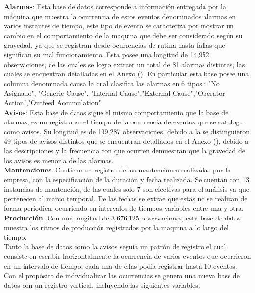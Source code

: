 \documentclass[10pt]{article}
\begin{document}
\textbf{Alarmas}: Esta base de datos corresponde a información entregada por la máquina que muestra la ocurrencia de estos eventos denominados alarmas en varios instantes de tiempo, este tipo de evento se caracteriza por mostrar un cambio en el comportamiento de la maquina que debe ser considerado según su gravedad, ya que se registran desde ocurrencias de rutina hasta  fallas que significan su mal funcionamiento. Esta posee una longitud de 14,952 observaciones, de las cuales se logro extraer un total de 81 alarmas distintas, las cuales se encuentran detalladas en el Anexo (). En particular esta base posee una columna denominada causa la cual clasifica las alarmas en 6 tipos : "No Asignado", "Generic Cause", "Internal Cause","External Cause","Operator Action","Outfeed Accumulation"\\

\textbf{Avisos}: Esta base de datos sigue el mismo comportamiento que la base de alarmas, es un registro en el tiempo de la ocurrencia de eventos que se catalogan como avisos. Su longitud es de 199,287 observaciones, debido a la 
se distinguieron 49 tipos de avisos distintos que se encuentran detallados en el Anexo (), debido a las descripciones y la frecuencia con que ocurren demuestran que la gravedad de los avisos es menor a de las alarmas.\\

\textbf{Mantenciones}: Contiene un registro de las mantenciones realizadas por la empresa, con la especificación de la duración y fecha realizada. Se cuentan con 13 instancias de mantención, de las cuales solo 7 son efectivas para el análisis ya que pertenecen al marco temporal. De las fechas se extrae que estas no se realizan de forma periodica, ocurriendo en intervalos de tiempos variables entre una y otra.\\

\textbf{Producción}: Con una longitud de 3,676,125 observaciones, esta base de datos muestra los ritmos de producción registrados por la maquina a lo largo del tiempo. \\

Tanto la base de datos como la avisos seguía un patrón de registro el cual consiste en escribir horizontalmente la ocurrencia de varios eventos que ocurrieron en un intervalo de tiempo, cada una de ellas podia registrar hasta 10 eventos. Con el propósito de individualizar las ocurrencias se genero una nueva base de datos con un registro vertical, incluyendo las siguientes variables:
\end{document}
